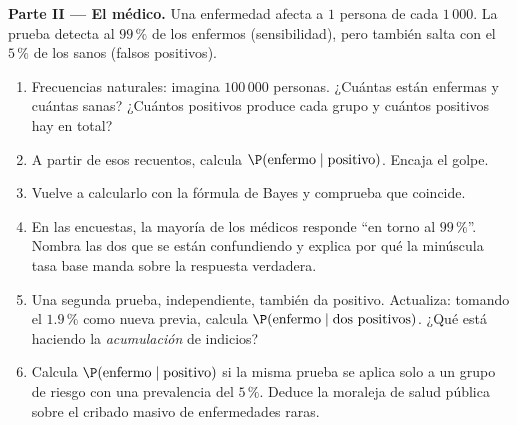 \begin{problem}
\medskip
\noindent\textbf{Parte II --- El médico.}
Una enfermedad afecta a $1$ persona de cada $1\,000$. La prueba detecta al
$99\,\%$ de los enfermos (sensibilidad), pero también salta con el
$5\,\%$ de los sanos (falsos positivos).
\begin{enumerate}[resume]
  \item Frecuencias naturales: imagina $100\,000$ personas. ¿Cuántas están
        enfermas y cuántas sanas? ¿Cuántos positivos produce cada grupo y
        cuántos positivos hay en total?
  \item A partir de esos recuentos, calcula
        $\P(\text{enfermo} \mid \text{positivo})$. Encaja el golpe.
  \item Vuelve a calcularlo con la fórmula de Bayes y comprueba que
        coincide.
  \item En las encuestas, la mayoría de los médicos responde ``en torno al
        $99\,\%$''. Nombra las dos  que se
        están confundiendo y explica por qué la minúscula tasa base manda
        sobre la respuesta verdadera.
  \item Una segunda prueba, independiente, también da positivo.
        Actualiza: tomando el $1.9\,\%$ como nueva  previa,
        calcula $\P(\text{enfermo} \mid \text{dos positivos})$. ¿Qué está
        haciendo la \emph{acumulación} de indicios?
  \item Calcula $\P(\text{enfermo} \mid \text{positivo})$ si la misma
        prueba se aplica solo a un grupo de riesgo con una prevalencia del
        $5\,\%$. Deduce la moraleja de salud pública sobre el cribado
        masivo de enfermedades raras.
\end{enumerate}


\end{problem}
